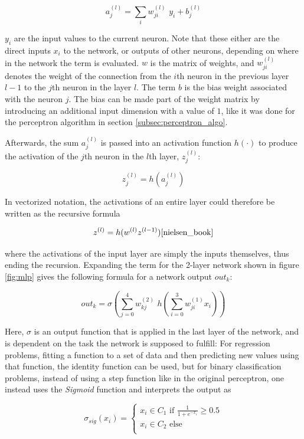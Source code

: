 \[ a_j^{(l)} = \sum \limits_{i} w^{(l)}_{ji}\,\, y_i + b^{(l)}_{j} \]

\noindent $y_i$ are the input values to the current neuron. Note that these either are the direct inputs $x_i$ to the network, or outputs of other neurons, depending on where in the network the term is evaluated. $w$ is the matrix of weights, and $w^{(l)}_{ji}$ denotes the weight of the connection from the $i$th neuron in the previous layer $l - 1$ to the $j$th neuron in the  layer $l$. The term $b$ is the bias weight associated with the neuron $j$. The bias can be made part of the weight matrix by introducing an additional input dimension with a value of $1$, like it was done for the perceptron algorithm in section \ref{subsec:perceptron_algo}.

Afterwards, the sum $a^{(l)}_j$ is passed into an activation function $h(\cdot)$ to produce the activation of the $j$th neuron in the $l$th layer, $z_j^{(l)}$:

\[ z_j^{(l)} = h(a^{(l)}_j) \]

\noindent In vectorized notation, the activations of an entire layer could therefore be written as the recursive formula

\[ z^{(l)} = h(w^{(l)} z^{(l-1)}) \cite{nielsen_book} \]

\noindent where the activations of the input layer are simply the inputs themselves, thus ending the recursion. Expanding the term for the 2-layer network shown in figure \ref{fig:mlp} gives the following formula for a network output $out_k$:

\[ out_k = \sigma \left ( \sum \limits_{j=0}^{4} w^{(2)}_{kj}\,\, h \left ( \sum \limits_{i=0}^{3} w^{(1)}_{ji} x_i \right ) \right ) \label{eq:mlp_out} \]

\noindent Here, \textbf{$\sigma$} is an output function that is applied in the last layer of the network, and is dependent on the task the network is supposed to fulfill: For regression problems, fitting a function to a set of data and then predicting new values using that function, the identity function can be used, but for binary classification problems, instead of using a step function like in the original perceptron, one instead uses the \textit{Sigmoid} function and interprets the output as

\[ \sigma_{sig}(x_i) = \begin{cases}
				x_i \in C_1 \text{ if } \frac{1}{1 + e^{-x_i}} \geq 0.5 \\
				x_i \in C_2 \text{ else }\\
			 \end{cases}
\]

